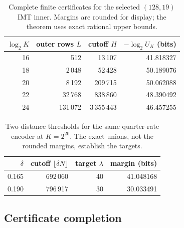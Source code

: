 \begin{table}[!htbp]
\centering
\caption{Complete finite certificates for the selected $(128,19)$ IMT inner.
Margins are rounded for display; the theorem uses exact rational upper bounds.}
\label{tab:finite-bch-margins}
\begin{tabular}{@{}rrrr@{}}
\toprule
$\log_2K$ & outer rows $L$ & cutoff $H$ & $-\log_2U_K$ (bits) \\
\midrule
16 & 512 & 13\,107 & 41.818327 \\
18 & 2\,048 & 52\,428 & 50.189076 \\
20 & 8\,192 & 209\,715 & 50.062088 \\
22 & 32\,768 & 838\,860 & 48.390492 \\
24 & 131\,072 & 3\,355\,443 & 46.457255 \\
\bottomrule
\end{tabular}
\end{table}

\begin{table}[!htbp]
\centering
\caption{Two distance thresholds for the same quarter-rate encoder at
$K=2^{20}$. The exact unions, not the rounded margins, establish the targets.}
\label{tab:finite-quarter-margins}
\begin{tabular}{@{}rrrr@{}}
\toprule
$\delta$ & cutoff $\lfloor\delta N\rfloor$ & target $\lambda$ & margin (bits) \\
\midrule
0.165 & 692\,060 & 40 & 41.048168 \\
0.190 & 796\,917 & 30 & 30.033491 \\
\bottomrule
\end{tabular}
\end{table}
\FloatBarrier

\subsection{Certificate completion}

